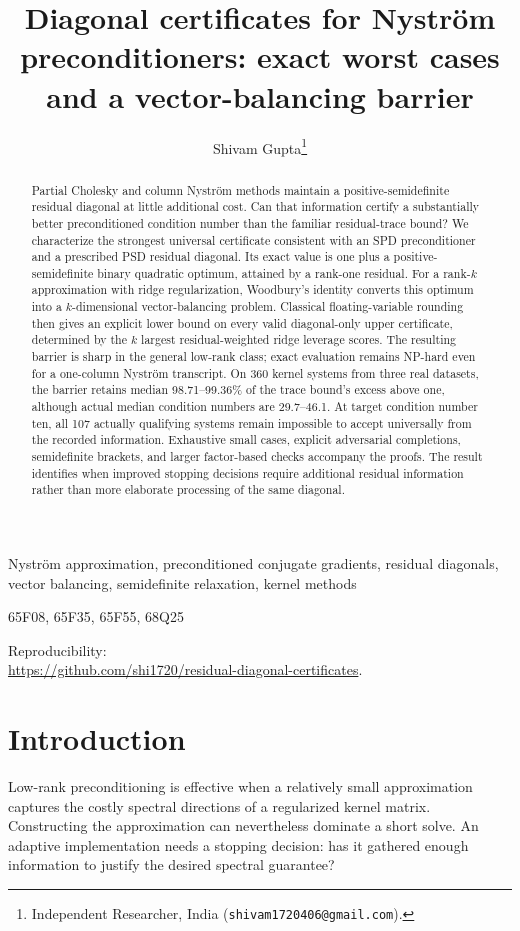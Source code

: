 \documentclass[final,leqno,letterpaper]{etna}
\title{Diagonal certificates for Nystr\"om preconditioners: exact worst cases and a vector-balancing barrier}
\author{Shivam Gupta\thanks{Independent Researcher, India
({\tt shivam1720406@gmail.com}).}}
\begin{document}
\maketitle
\linenumbers
\begin{abstract}
Partial Cholesky and column Nystr\"om methods maintain a positive-semidefinite residual diagonal at little additional cost. Can that information certify a substantially better preconditioned condition number than the familiar residual-trace bound? We characterize the strongest universal certificate consistent with an SPD preconditioner and a prescribed PSD residual diagonal. Its exact value is one plus a positive-semidefinite binary quadratic optimum, attained by a rank-one residual. For a rank-$k$ approximation with ridge regularization, Woodbury's identity converts this optimum into a $k$-dimensional vector-balancing problem. Classical floating-variable rounding then gives an explicit lower bound on every valid diagonal-only upper certificate, determined by the $k$ largest residual-weighted ridge leverage scores. The resulting barrier is sharp in the general low-rank class; exact evaluation remains NP-hard even for a one-column Nystr\"om transcript. On 360 kernel systems from three real datasets, the barrier retains median 98.71--99.36\% of the trace bound's excess above one, although actual median condition numbers are 29.7--46.1. At target condition number ten, all 107 actually qualifying systems remain impossible to accept universally from the recorded information. Exhaustive small cases, explicit adversarial completions, semidefinite brackets, and larger factor-based checks accompany the proofs. The result identifies when improved stopping decisions require additional residual information rather than more elaborate processing of the same diagonal.
\end{abstract}
\begin{keywords}
Nystr\"om approximation, preconditioned conjugate gradients, residual diagonals, vector balancing, semidefinite relaxation, kernel methods
\end{keywords}
\begin{AMS}
65F08, 65F35, 65F55, 68Q25
\end{AMS}
\noindent Reproducibility:\\
{\small\url{https://github.com/shi1720/residual-diagonal-certificates}}.

\section{Introduction}
Low-rank preconditioning is effective when a relatively small approximation captures the costly spectral directions of a regularized kernel matrix. Constructing the approximation can nevertheless dominate a short solve. An adaptive implementation needs a stopping decision: has it gathered enough information to justify the desired spectral guarantee?
\end{document}
